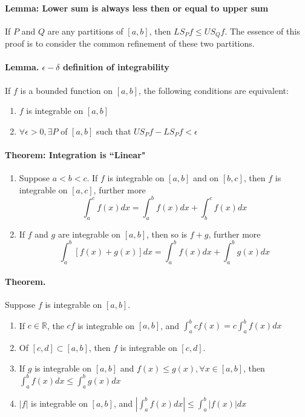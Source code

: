 \documentclass[11pt]{article}
\begin{document}
\paragraph{Lemma: Lower sum is always less then or equal to upper sum} If $P$ and $Q$ are any partitions of $[a,b]$, then $LS_Pf \leq US_Qf$. The essence of this proof is to consider the common refinement of these two partitions.

\paragraph{Lemma. $\epsilon-\delta$ definition of integrability} If $f$ is a bounded function on $[a,b]$, the following conditions are equivalent:
\begin{enumerate}
    \item $f$ is integrable on $[a,b]$
    \item $\forall \epsilon > 0, \exists P$ of $[a,b]$ such that $US_Pf - LS_Pf < \epsilon$
\end{enumerate}

\paragraph{Theorem:  Integration is ``Linear"}
\begin{enumerate}
    \item Suppose $a < b<c$. If $f$ is integrable on $[a,b]$ and on $[b,c]$, then $f$ is integrable on $[a,c]$, further more
    \begin{equation*}
        \int_a^c f(x)dx = \int_a^b f(x)dx + \int_b^c f(x)dx
    \end{equation*}
    \item If $f$ and $g$ are integrable on $[a,b]$, then so is $f+g$, further more
    \begin{equation*}
        \int_a^b [f(x) + g(x)]dx = \int_a^b f(x)dx + \int_a^b g(x)dx
    \end{equation*}
\end{enumerate}

\paragraph{Theorem.} Suppose $f$ is integrable on $[a,b]$.
\begin{enumerate}
    \item If $c\in \mathbb{R}$, the $cf$ is integrable on $[a,b]$, and $\int_a^b cf(x) = c\int_a^bf(x)dx$
    \item Of $[c,d] \subset [a,b]$, then $f$ is integrable on $[c,d]$.
    \item If $g$ is integrable on $[a,b]$ and $f(x) \leq g(x),\forall x \in [a,b]$, then $\int_a^b f(x)dx\leq \int_a^b g(x)dx$
    \item $|f|$ is integrable on $[a,b]$, and $\left|\int_a^bf(x)dx\right| \leq \int_a^b |f(x)|dx$
\end{enumerate}
\end{document}
